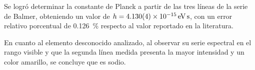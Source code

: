 Se logró determinar la constante de Planck a partir de las tres líneas de la serie de Balmer,
obteniendo un valor de \( h = \planckhexp \), con un error relativo porcentual de \qty{0.126}{\percent}
respecto al valor reportado en la literatura.

En cuanto al elemento desconocido analizado, al observar su serie espectral en el rango visible y  que la
segunda línea medida presenta la mayor intensidad y un color amarillo, se concluye que es sodio.
